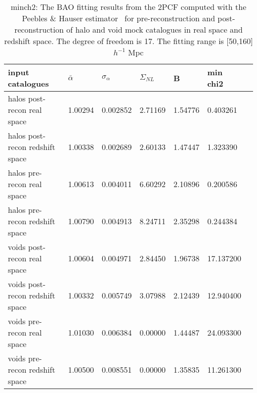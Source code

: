 \begin{table*}
\caption{minch2: The BAO fitting results from the 2PCF computed with the Peebles \& Hauser estimator~\cite{Peebles1974} for pre-reconstruction and  post-reconstruction of halo and void mock catalogues in real space and redshift space. The degree of freedom is 17. The fitting range is [50,160] $h^{-1}$ Mpc}
\label{tab:LS}
\begin{tabular}{lllllll}
\hline
input catalogues                &$\bar{\alpha}$&$\sigma_{\alpha}$&     $\Sigma_{NL}$ &        B &  min chi2 \\
\hline
halos post-recon real space     & 1.00294 & 0.002852 & 2.71169 & 1.54776 & 0.403261  \\
halos post-recon redshift space & 1.00338 & 0.002689 & 2.60133 & 1.47447 & 1.323390  \\
halos pre-recon real space      & 1.00613 & 0.004011 & 6.60292 & 2.10896 & 0.200586  \\
halos pre-recon redshift space  & 1.00790 & 0.004913 & 8.24711 & 2.35298 & 0.244384  \\
\hline
voids post-recon real space     & 1.00604 & 0.004971 & 2.84450 & 1.96738 & 17.137200 \\
voids post-recon redshift space & 1.00332 & 0.005749 & 3.07988 & 2.12439 & 12.940400 \\
voids pre-recon real space      & 1.01030 & 0.006384 & 0.00000 & 1.44487 & 24.093300 \\
voids pre-recon redshift space  & 1.00500 & 0.008551 & 0.00000 & 1.35835 & 11.261300 \\
\hline
\end{tabular}
\end{table*}

